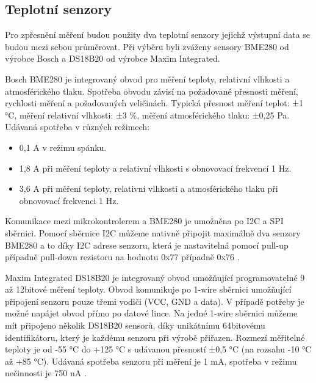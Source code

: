 \subsection{Teplotní senzory}
\par Pro zpřesnění měření budou použity dva teplotní senzory jejichž výstupní data se budou mezi sebou průměrovat. Při výběru byli zváženy sensory BME280 od výrobce Bosch a DS18B20 od výrobce Maxim Integrated. 
\par Bosch BME280 je integrovaný obvod pro měření teploty, relativní vlhkosti a atmosférického tlaku. Spotřeba obvodu závisí na požadované přesnosti měření, rychlosti měření a požadovaných veličinách. Typická přesnost měření teplot: ±1 °C, měření relativní vlhkosti: ±3 \%, měření atmosférického tlaku: ±0,25 Pa. Udávaná spotřeba v různých režimech: 
    \begin{itemize}
        \item 0,1 \mikro A v režimu spánku.
        \item 1,8 \mikro A při měření teploty a relativní vlhkosti s obnovovací frekvencí 1 Hz.
        \item 3,6 \mikro A při měření teploty, relativní vlhkosti a atmosférického tlaku při obnovovací frekvenci 1 Hz.
    \end{itemize}
Komunikace mezi mikrokontrolerem a BME280 je umožněna po I2C a SPI sběrnici. Pomocí sběrnice I2C můžeme nativně připojit maximálně dva senzory BME280 a to díky I2C adrese senzoru, která je nastavitelná pomocí pull-up případně pull-down rezistoru na hodnotu 0x77 případně 0x76 \cite{h58i7wDeqx5UV21c}.
\par Maxim Integrated DS18B20 je integrovaný obvod umožňující programovatelné 9 až 12bitové měření teploty. Obvod komunikuje po 1-wire sběrnici umožňující připojení senzoru pouze třemi vodiči (VCC, GND a data). V případě potřeby je možné napájet obvod přímo po datové lince. Na jedné 1-wire sběrnici můžeme mít připojeno několik DS18B20 sensorů, díky unikátnímu 64bitovému identifikátoru, který je každému senzoru při výrobě přiřazen. Rozmezí měřitelné teploty je od -55 °C do +125 °C s udávanou přesností ±0,5 °C (na rozsahu -10 °C až +85 °C). Udávaná spotřeba senzoru při měření je 1 mA, spotřeba v režimu nečinnosti je 750 nA \cite{x3UaJyQqMZRLqJsg}.
